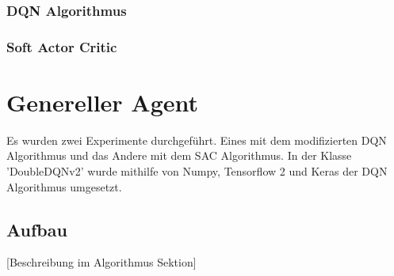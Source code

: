 \documentclass[a4paper,titlepage]{article}
\numberwithin{equation}{section} %
\begin{document}
{\subsubsection{DQN Algorithmus}

\subsubsection{Soft Actor Critic}



\section{Genereller Agent}
Es wurden zwei Experimente durchgeführt. Eines mit dem modifizierten DQN Algorithmus und das Andere mit dem SAC Algorithmus. In der Klasse 'DoubleDQNv2' wurde mithilfe von Numpy\cite{harris2020array}, Tensorflow 2\cite{tensorflow2015-whitepaper} und Keras\cite{keras} der DQN Algorithmus umgesetzt.

\subsection{Aufbau}
[Beschreibung im Algorithmus Sektion]
}
\end{document}
